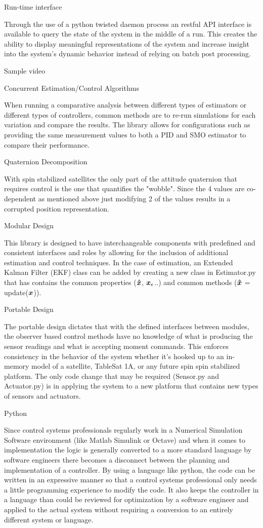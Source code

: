 Run-time interface

Through the use of a python twisted daemon process an restful API interface is available to query the state of the system in the middle of a run. This creates the ability to display meaningful representations of the system and increase insight into the system's dynamic behavior instead of relying on batch post processing.

Sample video

Concurrent Estimation/Control Algorithms

When running a comparative analysis between different types of estimators or different types of controllers, common methods are to re-run simulations for each variation and compare the results. The library allows for configurations such as providing the same measurement values to both a PID and SMO estimator to compare their performance.

Quaternion Decomposition

With spin stabilized satellites the only part of the attitude quaternion that requires control is the one that quantifies the "wobble". Since the 4 values are co-dependent as mentioned above just modifying 2 of the values results in a corrupted position representation.

Modular Design

This library is designed to have interchangeable components with predefined and consistent interfaces and roles by allowing for the inclusion of additional estimation and control techniques. In the case of estimation, an Extended Kalman Filter (EKF) class can be added by creating a new class in Estimator.py that has contains the common properties ($\boldsymbol{\hat{x}}$, $\boldsymbol{x}_e$..) and common methods ($\boldsymbol{\hat{x}}$ = update($\boldsymbol{x}$)).

Portable Design

The portable design dictates that with the defined interfaces between modules, the observer based control methods have no knowledge of what is producing the sensor readings and what is accepting moment commands. This enforces consistency in the behavior of the system whether it's hooked up to an in-memory model of a satellite, TableSat 1A, or any future spin spin stabilized platform. The only code change that may be required (Sensor.py and Actuator.py) is in applying the system to a new platform that contains new types of sensors and actuators.

Python

Since control systems professionals regularly work in a Numerical Simulation Software environment (like Matlab Simulink or Octave) and when it comes to implementation the logic is generally converted to a more standard language by software engineers there becomes a disconnect between the planning and implementation of a controller. By using a language like python, the code can be written in an expressive manner so that a control systems professional only needs a little programming experience to modify the code. It also keeps the controller in a language than could be reviewed for optimization by a software engineer and applied to the actual system without requiring a conversion to an entirely different system or language.


